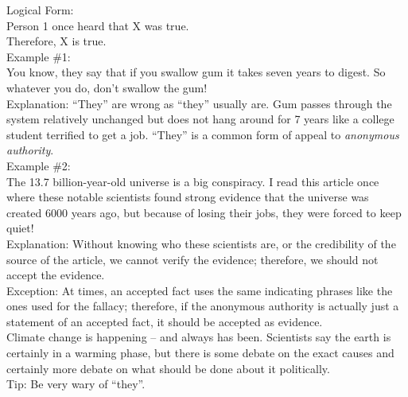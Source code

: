 \documentclass[a4paper,12pt,single,pdftex]{scrbook}
\begin{document}
    
      Logical Form:
    \\

    
      Person 1 once heard that X was true.
    \\

    
      Therefore, X is true.
    \\

    
      Example \#1:
    \\

    
      You know, they say that if you swallow gum it takes seven years to digest.  So whatever you do, don’t swallow the gum!
    \\

    
      Explanation: “They” are wrong as “they” usually are.  Gum passes through the system relatively unchanged but does not hang around for 7 years like a college student terrified to get a job.  “They” is a common form of appeal to {\it anonymous authority}.
    \\

    
      Example \#2:
    \\

    
      The 13.7 billion-year-old universe is a big conspiracy.  I read this article once where these notable scientists found strong evidence that the universe was created 6000 years ago, but because of losing their jobs, they were forced to keep quiet!
    \\

    
      Explanation: Without knowing who these scientists are, or the credibility of the source of the article, we cannot verify the evidence; therefore, we should not accept the evidence.
    \\

    
      Exception: At times, an accepted fact uses the same indicating phrases like the ones used for the fallacy; therefore, if the anonymous authority is actually just a statement of an accepted fact, it should be accepted as evidence.
    \\

    
      Climate change is happening -- and always has been.  Scientists say the earth is certainly in a warming phase, but there is some debate on the exact causes and certainly more debate on what should be done about it politically.
    \\

    
      Tip: Be very wary of “they”.
    \\

  
\end{document}

